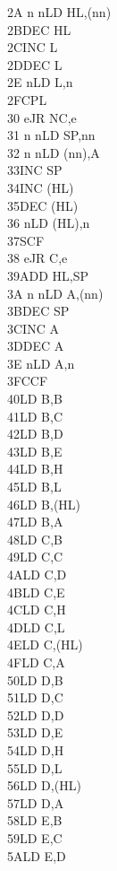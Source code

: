 \documentclass[oneside,a4paper]{book}
\begin{document}
\begin{multicols}{3}
{\begin{tabbing}
2A n n\>LD HL,(nn)\\
2B\>DEC HL\\
2C\>INC L\\
2D\>DEC L\\
2E n\>LD L,n\\
2F\>CPL\\
30 e\>JR NC,e\\
31 n n\>LD SP,nn\\
32 n n\>LD (nn),A\\
33\>INC SP\\
34\>INC (HL)\\
35\>DEC (HL)\\
36 n\>LD (HL),n\\
37\>SCF\\
38 e\>JR C,e\\
39\>ADD HL,SP\\
3A n n\>LD A,(nn)\\
3B\>DEC SP\\
3C\>INC A\\
3D\>DEC A\\
3E n\>LD A,n\\
3F\>CCF\\
40\>LD B,B\\
41\>LD B,C\\
42\>LD B,D\\
43\>LD B,E\\
44\>LD B,H\\
45\>LD B,L\\
46\>LD B,(HL)\\
47\>LD B,A\\
48\>LD C,B\\
49\>LD C,C\\
4A\>LD C,D\\
4B\>LD C,E\\
4C\>LD C,H\\
4D\>LD C,L\\
4E\>LD C,(HL)\\
4F\>LD C,A\\
50\>LD D,B\\
51\>LD D,C\\
52\>LD D,D\\
53\>LD D,E\\
54\>LD D,H\\
55\>LD D,L\\
56\>LD D,(HL)\\
57\>LD D,A\\
58\>LD E,B\\
59\>LD E,C\\
5A\>LD E,D\\

\end{tabbing}}
\end{multicols}
\end{document}
